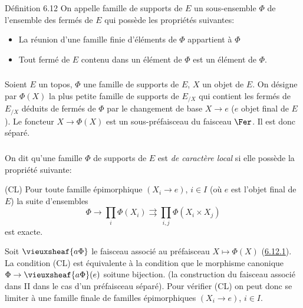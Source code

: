 \begin{enonce*}{Définition 6.12}
On appelle famille de supports de $E$ un sous-ensemble $\Phi$ de
l'ensemble des fermés de $E$ qui possède les propriétés
suivantes:
\begin{itemize}
\item[{\rm (S1)}] La réunion d'une famille finie d'éléments de $\Phi$
  appartient à $\Phi$
\item[{\rm (S2)}] Tout fermé de $E$ contenu dans un élément de $\Phi$
  est un élément de $\Phi$.
\end{itemize}
\end{enonce*}

\setcounter{subsection}{12}
\setcounter{subsubsection}{0}
\subsubsection{}
Soient $E$ un topos, $\Phi$ une famille de supports de $E$, $X$ un
objet de $E$. On désigne par $\Phi(X)$ la plus petite famille de
supports de $E_{/X}$ qui contient les fermés de $E_{/X}$ déduits
de fermés de $\Phi$ par le changement de base $X \to e$ ($e$ objet
final de $E$). Le foncteur $X \to \Phi(X)$ est un sous-préfaisceau
du faisceau $\Fer$. Il est donc séparé.

\subsubsection{}
On dit qu'une famille $\Phi$ de supports de $E$ est \emph{de
  caractère local} si elle possède la propriété suivante:

\noindent
(CL) Pour toute famille épimorphique $(X_i \to e)$, $i \in I$ (où
  $e$ est l'objet final de $E$) la suite d'ensembles
$$
\Phi \to \prod_i \Phi(X_i) \rightrightarrows \prod_{i, j} \Phi(X_i
\times X_j)
$$
est exacte.

Soit $\vieuxsheaf{a\Phi}$ le faisceau associé au préfaisceau $X \mapsto
\Phi(X)$ (\hyperref[V.subsubsec6.12.1]{6.12.1}). La condition (CL) est
équivalente à la condition que le morphisme canonique $\Phi \to
\vieuxsheaf{a\Phi} (e)$ soit\pageoriginale une bijection. (\cf la
construction du faisceau associé dans II dans le cas d'un
préfaisceau séparé). Pour vérifier (CL) on peut donc se limiter à
une famille finale de familles épimorphiques $(X_i \to e)$, $i \in
I$.

